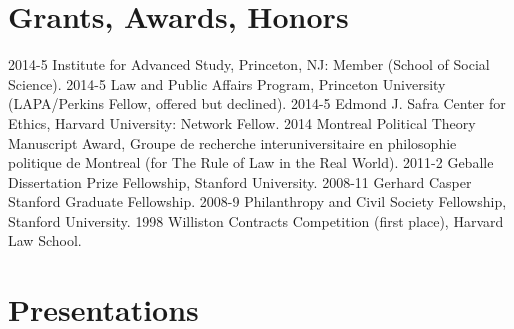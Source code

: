 \documentclass[letterpaper]{moderncv}
\begin{document}
\section{Grants, Awards, Honors}
\cvitem
{2014-5}
{Institute for Advanced Study, Princeton, NJ: Member (School of Social Science).}
\vspace{1mm}
\cvitem
{2014-5}
{Law and Public Affairs Program, Princeton University (LAPA/Perkins Fellow, offered but declined).}
\vspace{1mm}
\cvitem
{2014-5}
{Edmond J. Safra Center for Ethics, Harvard University: Network Fellow.}
\vspace{1mm}
\cvitem
{2014}
{Montreal Political Theory Manuscript Award, Groupe de recherche interuniversitaire en philosophie politique de Montreal (for The Rule of Law in the Real World).}
\vspace{1mm}
\cvitem
{2011-2}
{Geballe Dissertation Prize Fellowship, Stanford University.}
\vspace{1mm}
\cvitem
{2008-11}
{Gerhard Casper Stanford Graduate Fellowship.}
\vspace{1mm}
\cvitem
{2008-9}
{Philanthropy and Civil Society Fellowship, Stanford University.}
\vspace{1mm}
\cvitem
{1998}
{Williston Contracts Competition (first place), Harvard Law School.}
\vspace{1mm}


\section{Presentations}
\end{document}
